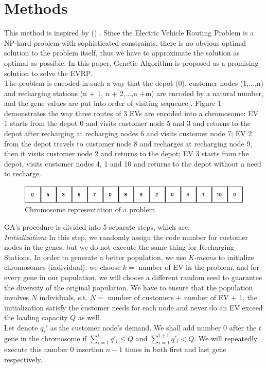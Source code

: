 \documentclass[conference,compsoc]{IEEEtran}
\begin{document}
\section{Methods}
This method is inspired by \citeauthor{evrptw} (\citeyear{evrptw}) \cite{evrptw}. Since the Electric Vehicle Routing Problem is a NP-hard problem with sophisticated constraints, there is no obvious optimal solution to the problem itself, thus we have to approximate the solution as optimal as possible. In this paper, Genetic Algorithm is proposed as a promising solution to solve the EVRP.\\

The problem is encoded in such a way that the depot (0), customer nodes (1,...,n) and recharging stations (n + 1, n + 2,...,n +m) are encoded by a natural number, and the gene values are put into order of visiting sequence \cite{evrptw}. Figure 1 demonstrates the way three routes of 3 EVs are encoded into a chromosome: EV 1 starts from the depot 0 and visits customer node 5 and 3 and returns to the depot after recharging at recharging nodes 6 and visits customer node 7; EV 2 from the depot travels to customer node 8 and recharges at recharging node 9, then it visits customer node 2 and returns to the depot; EV 3 starts from the depot, visits customer nodes 4, 1 and 10 and returns to the depot without a need to recharge.

\begin{figure}[h!]
    \centering
    \includegraphics[scale=0.42]{1}
    \caption{Chromosome representation of a problem}
    \label{fig:my_label}
\end{figure}


GA's procedure is divided into 5 separate steps, which are:\\

\textit{Initialization}: In this step, we randomly assign the code number for customer nodes in the genes, but we do not execute the same thing for Recharging Stations. In order to generate a better population, we use \textit{K-means} \cite{k-means} to initialize chromosomes (individual): we choose $k = $ number of EV in the problem, and for every gene in our population, we will choose a different random seed to guarantee the diversity of the original population. We have to ensure that the population involves $N$ individuals, s.t. $N = $ number of customers $+$ number of EV $+$ 1, the initialization satisfy the customer needs for each node and never do an EV exceed the loading capacity $Q$ as well.\\ Let denote $q_i'$ as the customer node's demand. We shall add number 0 after the $t$ gene in the chromosome if $\sum_{i = 1}^{t}{q'_i \leq Q}$ and $\sum_{i = 1}^{t+1}{q'_i < Q}$. We will repeatedly execute this number $0$ insertion $n - 1$ times in both first and last gene respectively.\\
\end{document}
